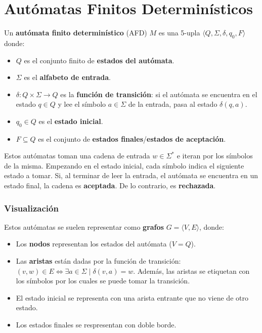 \section{Autómatas Finitos Determinísticos}
\label{definicion-afds}

Un \textbf{autómata finito determinístico} (AFD) $M$ es una 5-upla $\langle Q, \Sigma, \delta, q_0, F \rangle$ donde:
\begin{itemize}
    \item $Q$ es el conjunto finito de \textbf{estados del autómata}.
    \item $\Sigma$ es el \textbf{alfabeto de entrada}.
    \item $\delta: Q \times \Sigma \to Q$ es la \textbf{función de transición}: si el autómata se encuentra en el estado $q \in Q$ y lee el símbolo $a \in \Sigma$ de la entrada, pasa al estado $\delta(q, a)$.
    \item $q_0 \in Q$ es el \textbf{estado inicial}.
    \item $F \subseteq Q$ es el conjunto de \textbf{estados finales}/\textbf{estados de aceptación}.
\end{itemize}


Estos autómatas toman una cadena de entrada $w \in \Sigma^*$ e iteran por los símbolos de la misma. Empezando en el estado inicial, cada símbolo indica el siguiente estado a tomar. Si, al terminar de leer la entrada, el autómata se encuentra en un estado final, la cadena es \textbf{aceptada}. De lo contrario, es \textbf{rechazada}.

\subsubsection{Visualización}

Estos autómatas se suelen representar como \textbf{grafos} $G = \langle V, E \rangle$, donde:
\begin{itemize}
    \item Los \textbf{nodos} representan los estados del autómata ($V = Q$).
    \item Las \textbf{aristas} están dadas por la función de transición: $(v, w) \in E \iff \exists a \in \Sigma \mid \delta(v, a) = w$. Además, las aristas se etiquetan con los símbolos por los cuales se puede tomar la transición.
    \item El estado inicial se representa con una arista entrante que no viene de otro estado.
    \item Los estados finales se respresentan con doble borde.
\end{itemize}

